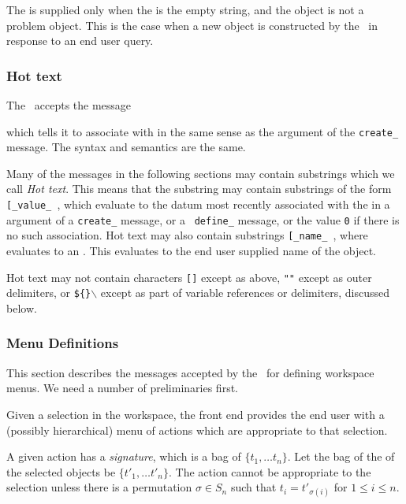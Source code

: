 The  is supplied only when the  is the
empty string, and the object is not a problem object. This is the case
when a new object is constructed by the \SM\ in response to an end
user query.


\subsubsection{{\sf Hot} text}\label{hottext}

The \FE\ accepts the message


\noindent
which tells it to associate  with  in the same
sense as the  argument of the {\tt create\_}
message. The syntax and semantics are the same.

Many of the messages in the following sections may contain substrings
which we call {\em{\sf Hot} text}. This means that the substring may
contain substrings of the form {\tt [\_value\_ }\marg{key}{\tt]}, which
evaluate to the datum most recently associated with the  in
a  argument of a {\tt create\_} message, or a {\tt
define\_} message, or the value {\tt 0} if there is no such
association. {\sf Hot} text may also contain substrings
{\tt[\_name\_ }\marg{expr}{\tt]}, where  evaluates to an
. This evaluates to the end user supplied name of the
object.

{\sf Hot} text may not contain characters {\tt[]} except as above,
{\tt""} except as outer delimiters, or {\tt\$\{\}$\backslash$} except
as part of variable references or delimiters, discussed below.


\subsubsection{Menu Definitions}\label{menu_defn}

This section describes the messages accepted by the \FE\ for defining
workspace menus. We need a number of preliminaries first.

Given a selection in the workspace, the front end provides the end
user with a (possibly hierarchical) menu of actions which are
appropriate to that selection.

A given action has a {\em signature}, which is a bag of 
$\{t_1,\dots t_n\}$. Let the bag of the  of the selected
objects be $\{t'_1,\dots t'_n\}$. The action cannot be appropriate to
the selection unless there is a permutation $\sigma\in S_n$ such that
$t_{i}=t'_{\sigma(i)}$ for $1\le i\le n$.

